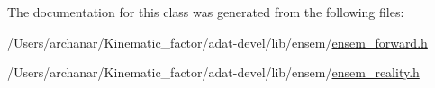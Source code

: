 The documentation for this class was generated from the following files\+:\begin{DoxyCompactItemize}
\item 
/\+Users/archanar/\+Kinematic\+\_\+factor/adat-\/devel/lib/ensem/\mbox{\hyperlink{adat-devel_2lib_2ensem_2ensem__forward_8h}{ensem\+\_\+forward.\+h}}\item 
/\+Users/archanar/\+Kinematic\+\_\+factor/adat-\/devel/lib/ensem/\mbox{\hyperlink{adat-devel_2lib_2ensem_2ensem__reality_8h}{ensem\+\_\+reality.\+h}}\end{DoxyCompactItemize}
